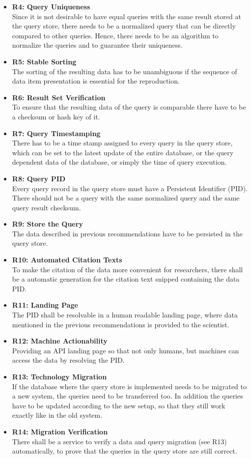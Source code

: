 \documentclass[draft,final]{vutinfth} %
\begin{document}
\begin{itemize}
\begin{itemize}
	\end{itemize}
	\item \textbf{R4: Query Uniqueness} \\
	Since it is not desirable to have equal queries with the same result stored at the query store, there needs to be a normalized query that can be directly compared to other queries. Hence, there needs to be an algorithm to normalize the queries and to guarantee their uniqueness.
	\item \textbf{R5: Stable Sorting} \\
	The sorting of the resulting data has to be unambiguous if the sequence of data item presentation is essential for the reproduction.
	\item \textbf{R6: Result Set Verification} \\
	To ensure that the resulting data of the query is comparable there have to be a checksum or hash key of it. 
	\item \textbf{R7: Query Timestamping} \\
	There has to be a time stamp assigned to every query in the query store, which can be set to the latest update of the entire database, or the query dependent data of the database, or simply the time of query execution.
	\item \textbf{R8: Query PID}\\
	Every query record in the query store must have a Persistent Identifier (PID). There should not be a query with the same normalized query and the same query result checksum. 
	\item \textbf{R9: Store the Query} \\
	The data described in previous recommendations have to be persisted in the query store.
	\item \textbf{R10: Automated Citation Texts} \\
	To make the citation of the data more convenient for researchers, there shall be a automatic generation for the citation text snipped containing the data PID.
	\item \textbf{R11: Landing Page} \\
	The PID shall be resolvable in a human readable landing page, where data mentioned in the previous recommendations is provided to the scientist.
	\item \textbf{R12: Machine Actionability} \\
	Providing an API landing page so that not only humans, but machines can access the data by resolving the PID.
	\item \textbf{R13: Technology Migration} \\
	If the database where the query store is implemented needs to be migrated to a new system, the queries need to be transferred too. In addition the queries have to be updated according to the new setup, so that they still work exactly like in the old system.
	\item \textbf{R14: Migration Verification} \\
	There shall be a service to verify a data and query migration (see R13) automatically, to prove that the queries in the query store are still correct. 
\end{itemize}
\end{document}
